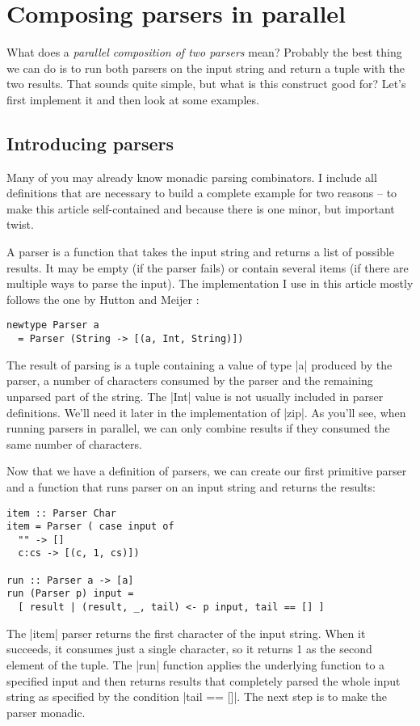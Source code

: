 \documentclass{tmr}
\begin{document}

\section{Composing parsers in parallel}
What does a \textit{parallel composition of two parsers} mean? Probably the best thing we can do 
is to run both parsers on the input string and return a tuple with the two results. That sounds
quite simple, but what is this construct good for? Let's first implement it and then look at 
some examples. 


\subsection{Introducing parsers}
Many of you may already know monadic parsing combinators. I include all definitions that are 
necessary to build a complete example for two reasons -- to make this article self-contained
and because there is one minor, but important twist.

A parser is a function that takes the 
input string and returns a list of possible results. It may be empty (if the parser fails) or 
contain several items (if there are multiple ways to parse the input). The implementation I use 
in this article mostly follows the one by Hutton and Meijer \cite{monadparsing}:

\begin{verbatim}
newtype Parser a
  = Parser (String -> [(a, Int, String)])
\end{verbatim}
The result of parsing is a tuple containing a value of type |a| produced by the parser, a number
of characters consumed by the parser and the remaining unparsed part of the string. The |Int| value
is not usually included in parser definitions. We'll need it later in the implementation of |zip|.
As you'll see, when running parsers in parallel, we can only combine results if they consumed the
same number of characters.

Now that we have a definition of parsers, we can create our first primitive parser and a 
function that runs parser on an input string and returns the results:

\begin{verbatim}
item :: Parser Char
item = Parser ( case input of
  "" -> []
  c:cs -> [(c, 1, cs)])
  
run :: Parser a -> [a]
run (Parser p) input = 
  [ result | (result, _, tail) <- p input, tail == [] ]
\end{verbatim}
The |item| parser returns the first character of the input string. When it succeeds, it consumes 
just a single character, so it returns 1 as the second element of the tuple. The |run| function
applies the underlying function to a specified input and then returns results that completely 
parsed the whole input string as specified by the condition |tail == []|. The next step is to make
the parser monadic.
\end{document}
